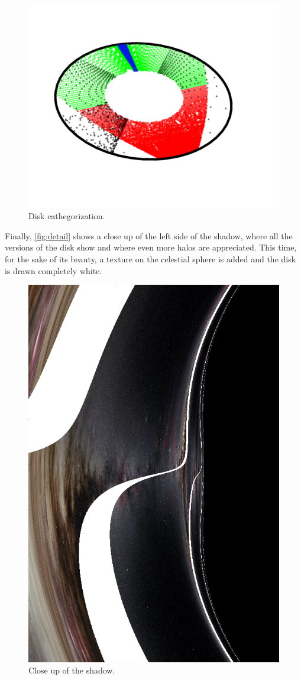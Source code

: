 \begin{figure}[bth]
	\myfloatalign
	\includegraphics[width=\linewidth]{gfx/disk_cathegorization2}
	\caption[Disk cathegorization.]{Disk cathegorization.}
	\label{fig:cathegories}
\end{figure}

Finally, \autoref{fig:detail} shows a close up of the left side of the shadow, where all the versions of the disk show and where even more halos are appreciated. This time, for the sake of its beauty, a texture on the celestial sphere is added and the disk is drawn completely white.

\begin{figure}[bth]
	\myfloatalign
	\includegraphics[width=.7\linewidth]{gfx/bh_detail_texture_disk-white}
	\caption[Close up of the shadow.]{Close up of the shadow.}
	\label{fig:detail}
\end{figure}